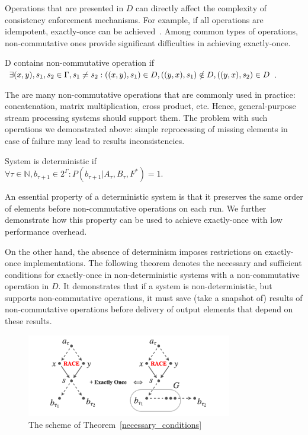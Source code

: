 Operations that are presented in $D$ can directly affect the complexity of consistency enforcement mechanisms. For example, if all operations are idempotent,  exactly-once can be achieved~\cite{Akidau:2013:MFS:2536222.2536229}. Among common types of operations, non-commutative ones provide significant difficulties in achieving exactly-once.

\begin{definition}{D contains non-commutative operation}
if\\ 
$\exists (x,y), s_1, s_2 \in \Gamma, s_1 \neq s_2: \\ ((x,y),s_1)\in D, \\ ((y,x),s_1)\notin D, \\ ((y,x),s_2)\in D$.
\end{definition}

The are many non-commutative operations that are commonly used in practice: concatenation, matrix multiplication, cross product, etc. Hence, general-purpose stream processing systems should support them. The problem with such operations we demonstrated above: simple reprocessing of missing elements in case of failure may lead to results inconsistencies.

\begin{definition}{System is deterministic}
if\\ 
$\forall{\tau\in{\mathbb{N}}, b_{\tau+1}\in{2^{\Gamma}}}:P(b_{\tau+1}|A_{\tau},B_\tau,F^{*})=1$.
\end{definition}

An essential property of a deterministic system is that it preserves the same order of elements before non-commutative operations on each run. We further demonstrate how this property can be used to achieve exactly-once with low performance overhead.

On the other hand, the absence of determinism imposes restrictions on exactly-once implementations. The following theorem denotes the necessary and sufficient conditions for exactly-once in non-deterministic systems with a non-commutative operation in $D$. It demonstrates that if a system is non-deterministic, but supports non-commutative operations, it must save (take a snapshot of) results of non-commutative operations before delivery of output elements that depend on these results.

\begin{figure}[t]
  \centering
  \includegraphics[width=0.8\textwidth]{Chapters/DeliveryGuarantees/pics/theorem-pic.png}
  \caption{The scheme of Theorem~\ref{necessary_conditions}}
  \label {theorem-pic}
\end{figure}

